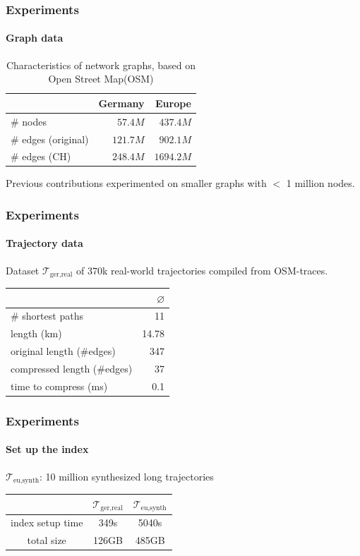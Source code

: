 \documentclass[10pt, t,
aspectratio=1610,%
usenames,
dvipsnames,
]{beamer}
\newcommand{\traj}[2]{\mathcal{T}_{\text{#1},\text{#2}}}
\begin{document}
\begin{frame}
	\frametitle{Experiments}
	\framesubtitle{Graph data}
	\begin{table}
		{
			\caption{Characteristics of network graphs, based on Open Street Map(OSM)}
			\begin{tabular}{|l|rr|}
				\hline
				                    & Germany  & Europe
				\\ \hline
				\# nodes            & $57.4M$  & $437.4M$  \\
				\# edges (original) & $121.7M$ & $902.1M$  \\
				\# edges (CH)       & $248.4M$ & $1694.2M$ \\
				\hline
			\end{tabular}
		}
	\end{table}
	\pause

	Previous contributions experimented on smaller graphs with $<$ 1 million nodes.
\end{frame}

\begin{frame}
	\frametitle{Experiments}
	\framesubtitle{Trajectory data}
	Dataset $\traj{ger}{real}$ of 370k real-world trajectories compiled from OSM-traces.
	\begin{table}
		{
			\begin{tabular}{|l|r|}
				\hline
				                            & $\varnothing$ \\
				\hline
				\# shortest paths           & 11            \\
				length (km)                 & 14.78         \\
				original length (\#edges)   & 347           \\
				compressed length (\#edges) & 37            \\
				time to compress (ms)       & 0.1           \\
				\hline
			\end{tabular}
		}
	\end{table}
\end{frame}

\begin{frame}
	\frametitle{Experiments}
	\framesubtitle{Set up the index}
	\begin{table}
		{
			$\traj{eu}{synth}$: 10 million synthesized long trajectories \pause

			\centering
			\begin{tabular}{|c|cc|}
				\hline
				                 & $\traj{ger}{real}$ & $\traj{eu}{synth}$ \\
				\hline
				index setup time & 349s               & 5040s              \\
				total size       & 126GB              & 485GB              \\
				\hline
			\end{tabular}
		}
	\end{table}
\end{frame}
\end{document}
